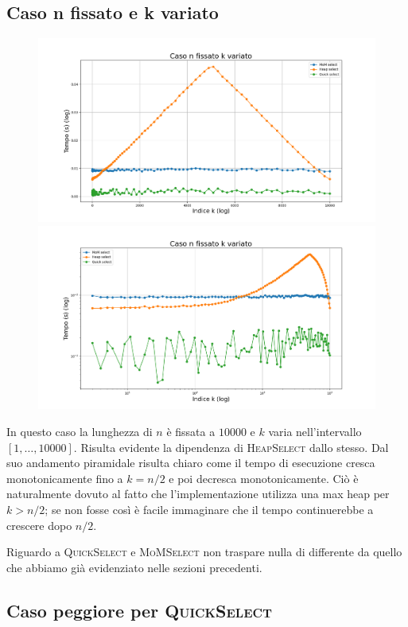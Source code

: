 \documentclass[a4paper,12pt]{article}
\newcommand{\QuickSelect}{\textsc{QuickSelect}}
\newcommand{\HeapSelect}{\textsc{HeapSelect}}
\newcommand{\MoMSelect}{\textsc{MoMSelect}}
\begin{document}
\subsection{Caso n fissato e k variato}
\begin{figure}[h]
    \centering
    \includegraphics[width=.83\textwidth]{graphs/n_fixed_n.png}
    \includegraphics[width=.83\textwidth]{graphs/n_fixed_2xlog.png}
\end{figure}

In questo caso la lunghezza di $n$ è fissata a $10000$ e $k$ varia nell'intervallo $[1,\dots,10000]$.
Risulta evidente la dipendenza di \HeapSelect{} dallo stesso.
Dal suo andamento piramidale risulta chiaro come il tempo di esecuzione cresca monotonicamente fino a $k=n/2$ e poi decresca monotonicamente.
Ciò è naturalmente dovuto al fatto che l'implementazione utilizza una max heap per $k>n/2$; se non fosse così è facile immaginare che il tempo continuerebbe a crescere dopo $n/2$.

Riguardo a \QuickSelect{} e \MoMSelect{} non traspare nulla di differente da quello che abbiamo già evidenziato nelle sezioni precedenti.

\newpage
\subsection{Caso peggiore per \QuickSelect}
\end{document}
